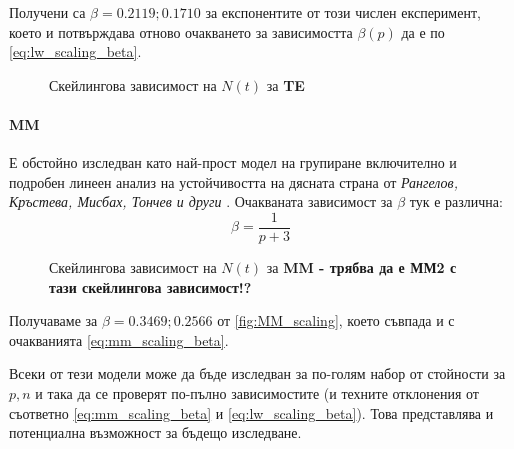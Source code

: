 Получени са $\beta = 0.2119; 0.1710$ за експонентите от този числен експеримент, което и потвърждава отново очакването за зависимостта $\beta(p)$ да е по \autoref{eq:lw_scaling_beta}.
\begin{figure}[hbpt]
    \centering
    \caption{Скейлингова зависимост на $N(t)$ за \textbf{TE}}
    \label{fig:TE_scaling}
\end{figure}

\paragraph{MM} Е обстойно изследван като най-прост модел на групиране включително и подробен линеен анализ на устойчивостта на дясната страна  от \textit{Рангелов, Кръстева, Мисбах, Тончев и други} \cite{Ranguelov2012}. Очакваната зависимост за $\beta$ тук е различна:
\begin{equation}
    \beta = \frac{1}{p+3}
    \label{eq:mm_scaling_beta}
\end{equation} 
\begin{figure}[hbpt]
    \centering
    \caption{Скейлингова зависимост на $N(t)$ за \textbf{MM - трябва да е ММ2 с тази скейлингова зависимост!?}}
    \label{fig:MM_scaling}
\end{figure}

Получаваме за $\beta = 0.3469; 0.2566$ от \autoref{fig:MM_scaling}, което съвпада и с очакванията \autoref{eq:mm_scaling_beta}.

Всеки от тези модели може да бъде изследван за по-голям набор от стойности за $p, n$ и така да се проверят по-пълно зависимостите (и техните отклонения от съответно \autoref{eq:mm_scaling_beta} и \autoref{eq:lw_scaling_beta}). Това представлява и потенциална възможност за бъдещо изследване.

